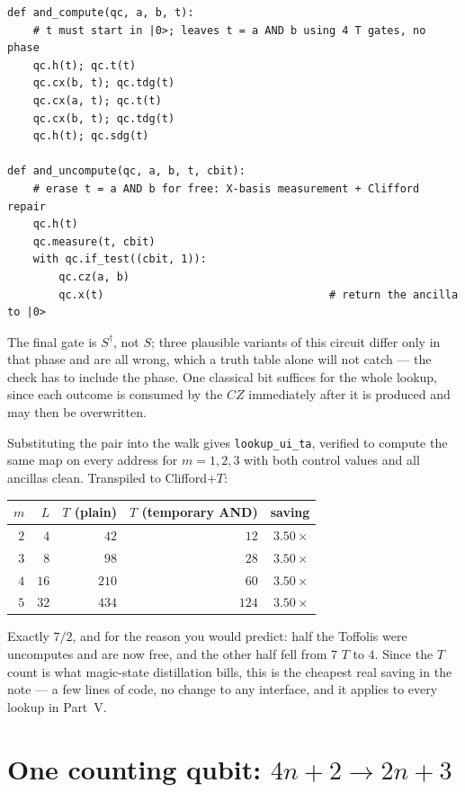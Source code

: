 \documentclass[11pt]{article}
\newcommand{\code}[1]{\texttt{#1}}
\theoremstyle{plain}
\theoremstyle{remark}
\begin{document}
\begin{lstlisting}
def and_compute(qc, a, b, t):
    # t must start in |0>; leaves t = a AND b using 4 T gates, no phase
    qc.h(t); qc.t(t)
    qc.cx(b, t); qc.tdg(t)
    qc.cx(a, t); qc.t(t)
    qc.cx(b, t); qc.tdg(t)
    qc.h(t); qc.sdg(t)

def and_uncompute(qc, a, b, t, cbit):
    # erase t = a AND b for free: X-basis measurement + Clifford repair
    qc.h(t)
    qc.measure(t, cbit)
    with qc.if_test((cbit, 1)):
        qc.cz(a, b)
        qc.x(t)                                   # return the ancilla to |0>
\end{lstlisting}

\noindent
The final gate is $S^\dagger$, not $S$; three plausible variants of this circuit differ only in
that phase and are all wrong, which a truth table alone will not catch --- the check has to include
the phase. One classical bit suffices for the whole lookup, since each outcome is consumed by the
$CZ$ immediately after it is produced and may then be overwritten.

Substituting the pair into the walk gives \code{lookup\_ui\_ta}, verified to compute the same map
on every address for $m=1,2,3$ with both control values and all ancillas clean. Transpiled to
Clifford$+T$:

\begin{center}\small
\begin{tabular}{@{}rrrrr@{}}
\toprule
$m$ & $L$ & $T$ (plain) & $T$ (temporary AND) & saving\\
\midrule
$2$ & $4$  & $42$  & $12$  & $3.50\times$\\
$3$ & $8$  & $98$  & $28$  & $3.50\times$\\
$4$ & $16$ & $210$ & $60$  & $3.50\times$\\
$5$ & $32$ & $434$ & $124$ & $3.50\times$\\
\bottomrule
\end{tabular}
\end{center}

\noindent
Exactly $7/2$, and for the reason you would predict: half the Toffolis were uncomputes and are now
free, and the other half fell from $7$ $T$ to $4$. Since the $T$ count is what magic-state
distillation bills, this is the cheapest real saving in the note --- a few lines of code, no change
to any interface, and it applies to every lookup in Part~V.

\section{One counting qubit: $4n+2 \to 2n+3$}\label{sec:onectrl}
\end{document}
